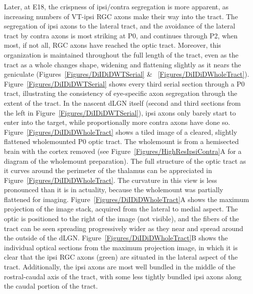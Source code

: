 Later, at E18, the crispness of ipsi/contra segregation is more apparent, as increasing numbers of VT-ipsi RGC axons make their way into the tract.
The segregation of ipsi axons to the lateral tract, and the avoidance of the lateral tract by contra axons is most striking at P0, and continues through P2, when most, if not all, RGC axons have reached the optic tract.
Moreover, this organization is maintained throughout the full length of the tract, even as the tract as a whole changes shape, widening and flattening slightly as it nears the geniculate (Figures~\ref{Figures/DiIDiDWTSerial} \& ~\ref{Figures/DiIDiDWholeTract}).
Figure~\ref{Figures/DiIDiDWTSerial} shows every third serial section through a P0 tract, illustrating the consistency of eye-specific axon segregation through the extent of the tract.
In the nascent dLGN itself (second and third sections from the left in Figure~\ref{Figures/DiIDiDWTSerial}), ipsi axons only barely start to enter into the target, while proportionally more contra axons have done so.
Figure~\ref{Figures/DiIDiDWholeTract} shows a tiled image of a cleared, slightly flattened wholemounted P0 optic tract.
The wholemount is from a hemisected brain with the cortex removed (see Figure~\ref{Figures/HighResIpsiContra}A for a diagram of the wholemount preparation).
The full structure of the optic tract as it curves around the perimeter of the thalamus can be appreciated in Figure~\ref{Figures/DiIDiDWholeTract}.
The curvature in this view is less pronounced than it is in actuality, because the wholemount was partially flattened for imaging.
Figure~\ref{Figures/DiIDiDWholeTract}A shows the maximum projection of the image stack, acquired from the lateral to medial aspect.
The optic is positioned to the right of the image (not visible), and the fibers of the tract can be seen spreading progressively wider as they near and spread around the outside of the dLGN.
Figure~\ref{Figures/DiIDiDWholeTract}B shows the individual optical sections from the maximum projection image, in which it is clear that the ipsi RGC axons (green) are situated in the lateral aspect of the tract.
Additionally, the ipsi axons are most well bundled in the middle of the rostral-caudal axis of the tract, with some less tightly bundled ipsi axons along the caudal portion of the tract.
